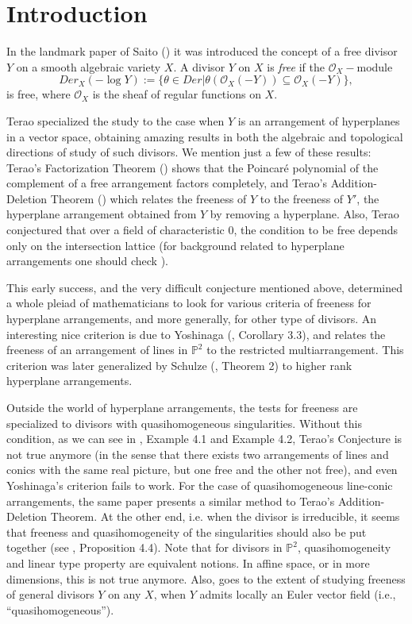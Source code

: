 \documentclass[12pt]{amsart}
\begin{document}
\section{Introduction}

In the landmark paper of Saito (\cite{s}) it was introduced the concept of a free divisor $Y$ on a smooth algebraic variety $X$. A divisor $Y$ on $X$ is {\em free} if the $\mathcal O_X-$module $$Der_X(-\log Y):=\{\theta\in Der|\theta(\mathcal O_X(-Y))\subseteq \mathcal O_X(-Y)\},$$ is free, where $\mathcal O_X$ is the sheaf of regular functions on $X$.

Terao specialized the study to the case when $Y$ is an arrangement of hyperplanes in a vector space, obtaining amazing results in both the algebraic and topological directions of study of such divisors. We mention just a few of these results: Terao's Factorization Theorem (\cite{t}) shows that the Poincar\'{e} polynomial of the complement of a free arrangement factors completely, and Terao's Addition-Deletion Theorem (\cite{t2}) which relates the freeness of $Y$ to the freeness of $Y'$, the hyperplane arrangement obtained from $Y$ by removing a hyperplane. Also, Terao conjectured that over a field of characteristic 0, the condition to be free depends only on the intersection lattice (for background related to hyperplane arrangements one should check \cite{ot}).

This early success, and the very difficult conjecture mentioned above, determined a whole pleiad of mathematicians to look for various criteria of freeness for hyperplane arrangements, and more generally, for other type of divisors. An interesting nice criterion is due to Yoshinaga (\cite{y1}, Corollary 3.3), and relates the freeness of an arrangement of lines in $\mathbb P^2$ to the restricted multiarrangement. This criterion was later generalized by Schulze (\cite{sc}, Theorem 2) to higher rank hyperplane arrangements.

Outside the world of hyperplane arrangements, the tests for freeness are specialized to divisors with quasihomogeneous singularities. Without this condition, as we can see in \cite{st}, Example 4.1 and Example 4.2, Terao's Conjecture is not true anymore (in the sense that there exists two arrangements of lines and conics with the same real picture, but one free and the other not free), and even Yoshinaga's criterion fails to work. For the case of quasihomogeneous line-conic arrangements, the same paper presents a similar method to Terao's Addition-Deletion Theorem. At the other end, i.e. when the divisor is irreducible, it seems that freeness and quasihomogeneity of the singularities should also be put together (see \cite{sim3}, Proposition 4.4). Note that for divisors in $\mathbb P^2$, quasihomogeneity and linear type property are equivalent notions. In affine space, or in more dimensions, this is not true anymore. Also, \cite{dssww} goes to the extent of studying freeness of general divisors $Y$ on any $X$, when $Y$ admits locally an Euler vector field (i.e., ``quasihomogeneous'').
\end{document}
